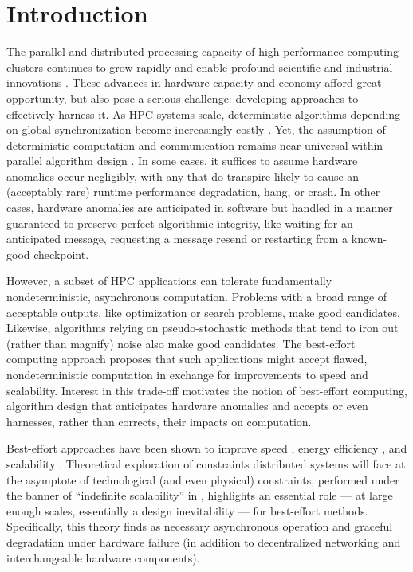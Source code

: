 \section{Introduction}

The parallel and distributed processing capacity of high-performance computing clusters continues to grow rapidly and enable profound scientific and industrial innovations \citep{gagliardi2019international}.
These advances in hardware capacity and economy afford great opportunity, but also pose a serious challenge: developing approaches to effectively harness it.
As HPC systems scale, deterministic algorithms depending on global synchronization become increasingly costly \citep{gropp2013programming,dongarra2014applied}.
Yet, the assumption of deterministic computation and communication remains near-universal within parallel algorithm design \citep{chakradhar2010best}.
In some cases, it suffices to assume hardware anomalies occur negligibly, with any that do transpire likely to cause an (acceptably rare) runtime performance degradation, hang, or crash.
In other cases, hardware anomalies are anticipated in software but handled in a manner guaranteed to preserve perfect algorithmic integrity, like waiting for an anticipated message, requesting a message resend or restarting from a known-good checkpoint.

However, a subset of HPC applications can tolerate fundamentally nondeterministic, asynchronous computation.
Problems with a broad range of acceptable outputs, like optimization or search problems, make good candidates.
Likewise, algorithms relying on pseudo-stochastic methods that tend to iron out (rather than magnify) noise also make good candidates.
The best-effort computing approach proposes that such applications might accept flawed, nondeterministic computation in exchange for improvements to speed and scalability.
Interest in this trade-off motivates the notion of best-effort computing, algorithm design that anticipates hardware anomalies and accepts or even harnesses, rather than corrects, their impacts on computation.

Best-effort approaches have been shown to improve speed \citep{chakrapani2008probabilistic}, energy efficiency \citep{bocquet2018memory}, and scalability \citep{meng2009best}.
Theoretical exploration of constraints distributed systems will face at the asymptote of technological (and even physical) constraints, performed under the banner of ``indefinite scalability'' in \citep{ackley2011pursue}, highlights an essential role --- at large enough scales, essentially a design inevitability --- for best-effort methods.
Specifically, this theory finds as necessary asynchronous operation and graceful degradation under hardware failure (in addition to decentralized networking and interchangeable hardware components).

